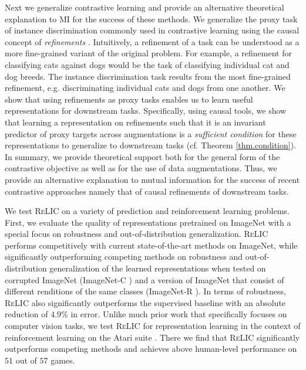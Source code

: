 \documentclass{article}
\newcommand{\relic}{\textsc{ReLIC}}
\begin{document}
Next we generalize contrastive learning and provide an alternative theoretical explanation to MI for the success of these methods.
We generalize the proxy task of instance discrimination commonly used in contrastive learning using the causal concept of \emph{refinements} \citep{chalupka2014visual}. 
Intuitively, a refinement of a task can be understood as a more fine-grained variant of the original problem. 
For example, a refinement for classifying cats against dogs would be the task of classifying individual cat and dog breeds. 
The instance discrimination task results from the most fine-grained refinement, e.g. discriminating individual cats and dogs from one another.
We show that using refinements as proxy tasks enables us to learn useful representations for downstream tasks.
Specifically, using causal tools, we show that learning a representation on refinements such that it is an invariant predictor of proxy targets across augmentations is a \emph{sufficient condition} for these representations to generalize to downstream tasks (cf. Theorem \ref{thm.condition}). 
In summary, we provide theoretical support both for the general form of the contrastive objective as well as for the use of data augmentations. 
Thus, we provide an alternative explanation to mutual information for the success of recent contrastive approaches namely that of causal refinements of downstream tasks. 

We test \relic{} on a variety of prediction and reinforcement learning problems. 
First, we evaluate the quality of representations pretrained on ImageNet with a special focus on robustness and out-of-distribution generalization.
\relic{} performs competitively with current state-of-the-art methods on ImageNet, while significantly outperforming competing methods on robustness and out-of-distribution generalization of the learned representations when tested on corrupted ImageNet (ImageNet-C \citep{hendrycks2019robustness}) and a version of ImageNet that consist of different renditions of the same classes (ImageNet-R \citep{hendrycks2020many}).
In terms of robustness, \relic{} also significantly outperforms the supervised baseline with an absolute reduction of $4.9\%$ in error.
Unlike much prior work that specifically focuses on computer vision tasks, we test \relic{} for representation learning in the context of reinforcement learning on the Atari suite \citep{Bellemare2013TheAL}.
There we find that \relic{} significantly outperforms competing methods and achieves above human-level performance on $51$ out of $57$ games.
\end{document}
